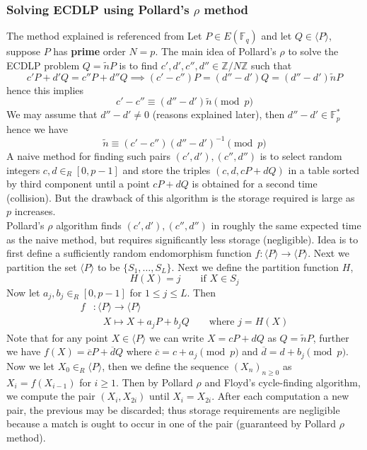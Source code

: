 \documentclass[a4 paper]{article}
\newcommand{\?}{\stackrel{?}{=}}
\begin{document}
\subsubsection{Solving ECDLP using Pollard's \texorpdfstring{$ \rho $}{TEXT} method}
The method explained is referenced from \cite[\S 4.1.2]{hankerson2006guide}Let $ P \in E(\mathbb{F}_q) $ and let $ Q \in \langle P \rangle $, suppose $ P $ has \textbf{prime} order $ N = p $. The main idea of Pollard's $ \rho $ to solve the ECDLP problem $ Q = \tilde{n}P $ is to find $ c', d' , c'', d'' \in \mathbb{Z} / N \mathbb{Z} $ such that 
$$ c'P  + d'Q = c'' P + d'' Q \implies (c'-c'')P = (d'' - d' )Q = (d''-d')\tilde{n}P$$
hence this implies 
$$ c' - c'' \equiv (d'' - d')\tilde{n} \pmod p $$
We may assume that $ d'' -d ' \neq 0 $ (reasons explained later), then $ d'' - d' \in \mathbb{F}_p^* $ hence we have
$$ \tilde{n} \equiv (c'-c'')(d''-d')^{-1} \pmod p $$
A naive method for finding such pairs $ (c',d'), (c'',d'') $ is to select random integers $ c,d\in_R [0,p-1] $ and store the triples $ (c,d,cP+dQ) $ in a table sorted by third component until a point $ cP + dQ $ is obtained for a second time (collision). But the drawback of this algorithm is the storage required is large as $ p $ increases. 
\\
Pollard's $ \rho $ algorithm finds $ (c',d'), (c'', d'') $ in roughly the same expected time as the naive method, but requires significantly less storage (negligible). Idea is to first define a sufficiently random endomorphism function $ f : \langle P  \rangle \to \langle P \rangle $. Next we partition the set $ \langle P  \rangle  $ to be $ \{S_1 , \dots , S_L\} $. Next we define the partition function $ H $, 
$$ H(X) = j \qquad \text{if } X \in S_j  $$
Now let $ a_j , b_j \in_R [0, p-1] $ for $ 1 \leq j \leq L $. Then 
\begin{align*}
    f & : \langle P   \rangle \to \langle P \rangle \\ 
        & \quad X \mapsto X + a_j P + b_j Q \qquad \text{where } j  = H(X)
\end{align*}
Note that for any point $ X \in \langle P \rangle  $ we can write $ X = cP + dQ $ as $ Q = \tilde{n} P $, further we have $ f(X) = \overline{c}P + \overline{d  }Q   $ where $ \overline{c} = c + a_j \pmod p $ and $ \overline{d }  = d + b_j \pmod p $. Now we let $ X_0 \in_R \langle P \rangle $, then we define the sequence $ (X_n)_{n\geq 0} $ as $ X_i = f(X_{i-1}) $ for $ i \geq 1  $. Then by Pollard $ \rho  $ and Floyd's cycle-finding algorithm, we compute the pair $ (X_i, X_{2i}) $ until $ X_i = X_{2i} $. After each computation a new pair, the previous may be discarded; thus storage requirements are negligible because a match is ought to occur in one of the pair (guaranteed by Pollard $ \rho $ method). 
\end{document}
